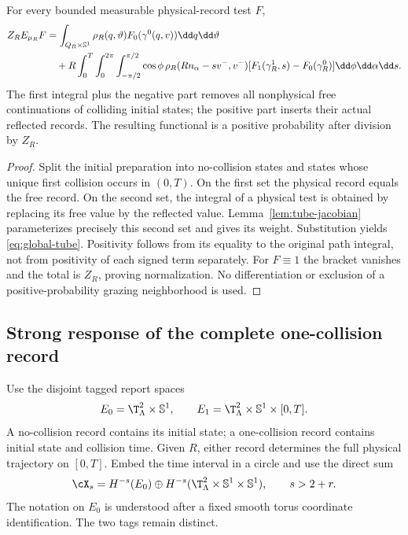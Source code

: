 \begin{theorem}\label{thm:global-tube}
For every bounded measurable physical-record test $F$,
\begin{align}
 Z_R E_{\mu_R}F
 &=\int_{Q_R\times\mathbb S^1}\rho_R(q,\vartheta)
 F_0(\gamma^0(q,v))\dd q\dd\vartheta\notag\\
 &\quad+R\int_0^T\int_0^{2\pi}\int_{-\pi/2}^{\pi/2}
 \cos\phi\,\rho_R(Rn_\alpha-sv^-,v^-)
 [F_1(\gamma_R^1,s)-F_0(\gamma_R^0)]\dd\phi\dd\alpha\dd s.
 \label{eq:global-tube}
\end{align}
The first integral plus the negative part removes all nonphysical free continuations of colliding initial states; the positive part inserts their actual reflected records. The resulting functional is a positive probability after division by $Z_R$.
\end{theorem}
\begin{proof}
Split the initial preparation into no-collision states and states whose unique first collision occurs in $(0,T)$. On the first set the physical record equals the free record. On the second set, the integral of a physical test is obtained by replacing its free value by the reflected value. Lemma~\ref{lem:tube-jacobian} parameterizes precisely this second set and gives its weight. Substitution yields \eqref{eq:global-tube}. Positivity follows from its equality to the original path integral, not from positivity of each signed term separately. For $F\equiv1$ the bracket vanishes and the total is $Z_R$, proving normalization. No differentiation or exclusion of a positive-probability grazing neighborhood is used.
\end{proof}

\subsection{Strong response of the complete one-collision record}
Use the disjoint tagged report spaces
\[
 E_0=\T_\Lambda^2\times\mathbb S^1,
 \qquad E_1=\T_\Lambda^2\times\mathbb S^1\times[0,T].
\]
A no-collision record contains its initial state; a one-collision record contains initial state and collision time. Given $R$, either record determines the full physical trajectory on $[0,T]$. Embed the time interval in a circle and use the direct sum
\[
 \cX_s=H^{-s}(E_0)\oplus H^{-s}(\T_\Lambda^2\times\mathbb S^1\times\mathbb S^1),
 \qquad s>2+r.
\]
The notation on $E_0$ is understood after a fixed smooth torus coordinate identification. The two tags remain distinct.


